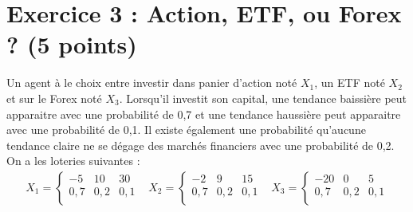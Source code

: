 \documentclass[12pt, a4paper]{exam}
\begin{document}
\section*{Exercice 3 : Action, ETF, ou Forex ? (5 points)}
Un agent à le choix entre investir dans panier d'action noté \(X_1\), un ETF noté \(X_2\) et sur le Forex noté \(X_3\). Lorsqu'il investit son capital, une tendance baissière peut apparaitre avec une probabilité de 0,7 et une tendance haussière peut apparaitre avec une probabilité de 0,1. Il existe également une probabilité qu'aucune tendance claire ne se dégage des marchés financiers avec une probabilité de 0,2. On a les loteries suivantes : 
\[ 
\begin{matrix}
	X_1=\left\{\begin{matrix}
		-5 & 10 & 30 \\
		0,7 & 0,2 & 0,1 \\
	\end{matrix}\right. & X_2=\left\{\begin{matrix}
		-2 & 9 & 15 \\
		0,7 & 0,2 & 0,1 \\
	\end{matrix}\right. & X_3=\left\{\begin{matrix}
		-20 & 0 & 5 \\
		0,7 & 0,2 & 0,1 \\
	\end{matrix}\right.
\end{matrix}
 \]
\end{document}
